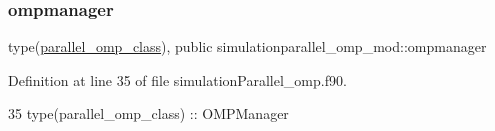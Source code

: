 \subsubsection{\texorpdfstring{ompmanager}{ompmanager}}
{\footnotesize\ttfamily type(\mbox{\hyperlink{structsimulationparallel__omp__mod_1_1parallel__omp__class}{parallel\+\_\+omp\+\_\+class}}), public simulationparallel\+\_\+omp\+\_\+mod\+::ompmanager}



Definition at line 35 of file simulation\+Parallel\+\_\+omp.\+f90.


\begin{DoxyCode}
35     \textcolor{keywordtype}{type}(parallel\_omp\_class) :: OMPManager
\end{DoxyCode}
